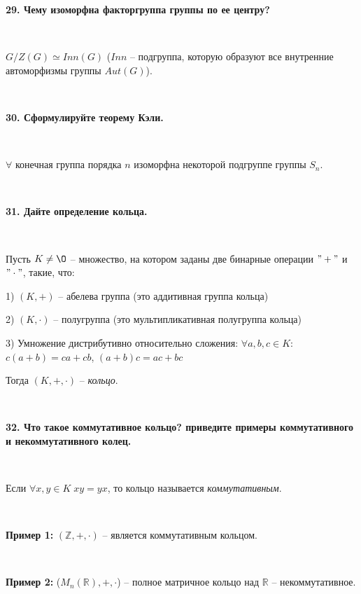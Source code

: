 \documentclass{article}
\begin{document}
    \textbf{29. Чему изоморфна факторгруппа группы по ее центру?}

    {
        $\;$
        \setlength{\parindent}{0.4cm}
        \hangindent=0.4cm

        $G/Z(G)\simeq Inn(G)$ ($Inn$ -- подгруппа, которую образуют все внутренние автоморфизмы группы $Aut(G)$).

        $\;$
        \setlength{\parindent}{0cm}
        \hangindent=0cm
    }

    \textbf{30. Сформулируйте теорему Кэли.}

    {
        $\;$
        \setlength{\parindent}{0.4cm}
        \hangindent=0.4cm

        $\forall$ конечная группа порядка $n$ изоморфна некоторой подгруппе группы $S_n$.

        $\;$
        \setlength{\parindent}{0cm}
        \hangindent=0cm
    }

    \textbf{31. Дайте определение кольца.}

    {
        $\;$
        \setlength{\parindent}{0.4cm}
        \hangindent=0.4cm

    Пусть $K\ne \O$ -- множество, на котором заданы две бинарные операции $"+"$ и $"\cdot"$, такие, что:

    1) $(K, +)$ -- абелева группа (это аддитивная группа кольца)

        2) $(K, \cdot)$ -- полугруппа (это мультипликативная полугруппа кольца)

        3) Умножение дистрибутивно относительно сложения: $\forall a, b, c\in K:$ $c(a+b)=ca+cb$, $(a+b)c=ac+bc$

        Тогда $(K, +, \cdot)$ -- \textit{кольцо}.

        $\;$
        \setlength{\parindent}{0cm}
        \hangindent=0cm
    }

    \textbf{32. Что такое коммутативное кольцо? приведите примеры коммутативного и некоммутативного колец.}

    {
        $\;$
        \setlength{\parindent}{0.4cm}
        \hangindent=0.4cm

    Если $\forall x, y\in K\;xy=yx$, то кольцо называется \textit{коммутативным}.

        $\;$

        \textbf{Пример 1:} $(\mathbb{Z}, +, \cdot)$ -- является коммутативным кольцом.

        $\;$

        \textbf{Пример 2:} ($M_n(\mathbb{R}), +, \cdot$) -- полное матричное кольцо над $\mathbb{R}$ -- некоммутативное.

        $\;$
        \setlength{\parindent}{0cm}
        \hangindent=0cm
    }
\end{document}
